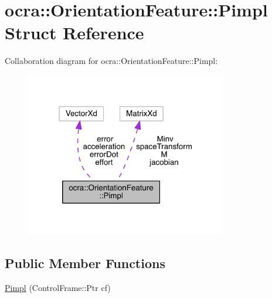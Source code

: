 \hypertarget{structocra_1_1OrientationFeature_1_1Pimpl}{}\section{ocra\+:\+:Orientation\+Feature\+:\+:Pimpl Struct Reference}
\label{structocra_1_1OrientationFeature_1_1Pimpl}


Collaboration diagram for ocra\+:\+:Orientation\+Feature\+:\+:Pimpl\+:\nopagebreak
\begin{figure}[H]
\begin{center}
\leavevmode
\includegraphics[width=250pt]{d4/dde/structocra_1_1OrientationFeature_1_1Pimpl__coll__graph}
\end{center}
\end{figure}
\subsection*{Public Member Functions}
\begin{DoxyCompactItemize}
\item 
\hyperlink{structocra_1_1OrientationFeature_1_1Pimpl_aa5a7e987e6c60ebd03c2acb696f85258}{Pimpl} (Control\+Frame\+::\+Ptr cf)
\end{DoxyCompactItemize}
